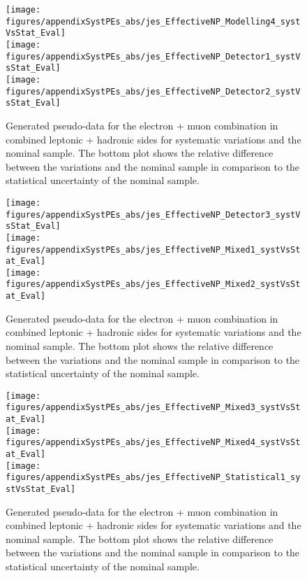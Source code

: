 \begin{figure}[!hb]
\begin{center}
        \texttt{[image: figures/appendixSystPEs\_abs/jes\_EffectiveNP\_Modelling4\_systVsStat\_Eval]}\\
        \texttt{[image: figures/appendixSystPEs\_abs/jes\_EffectiveNP\_Detector1\_systVsStat\_Eval]}\\
        \texttt{[image: figures/appendixSystPEs\_abs/jes\_EffectiveNP\_Detector2\_systVsStat\_Eval]}
        
\caption{Generated pseudo-data for the electron + muon combination in combined leptonic + hadronic sides for systematic variations and the nominal \ttbar sample. The bottom plot shows the relative difference between the variations and the nominal sample in comparison to the statistical uncertainty of the nominal sample.}   
\label{fig:systematicVar_lephad_JES_2_1}
\end{center}
\end{figure}

\begin{figure}[!hb]
\begin{center}
        \texttt{[image: figures/appendixSystPEs\_abs/jes\_EffectiveNP\_Detector3\_systVsStat\_Eval]}\\
        \texttt{[image: figures/appendixSystPEs\_abs/jes\_EffectiveNP\_Mixed1\_systVsStat\_Eval]}\\
        \texttt{[image: figures/appendixSystPEs\_abs/jes\_EffectiveNP\_Mixed2\_systVsStat\_Eval]}
\caption{Generated pseudo-data for the electron + muon combination in combined leptonic + hadronic sides for systematic variations and the nominal \ttbar sample. The bottom plot shows the relative difference between the variations and the nominal sample in comparison to the statistical uncertainty of the nominal sample.}   
\label{fig:systematicVar_lephad_JES_2_2}
\end{center}
\end{figure}
        
\begin{figure}[!hb]
\begin{center}
        \texttt{[image: figures/appendixSystPEs\_abs/jes\_EffectiveNP\_Mixed3\_systVsStat\_Eval]}\\
        \texttt{[image: figures/appendixSystPEs\_abs/jes\_EffectiveNP\_Mixed4\_systVsStat\_Eval]}\\
        \texttt{[image: figures/appendixSystPEs\_abs/jes\_EffectiveNP\_Statistical1\_systVsStat\_Eval]}\\
\caption{Generated pseudo-data for the electron + muon combination in combined leptonic + hadronic sides for systematic variations and the nominal \ttbar sample. The bottom plot shows the relative difference between the variations and the nominal sample in comparison to the statistical uncertainty of the nominal sample.}   
\label{fig:systematicVar_lephad_JES_3_1}
\end{center}
\end{figure}        
        
